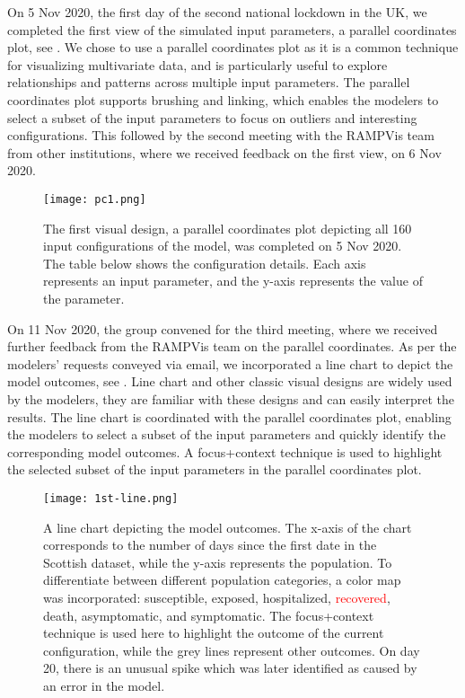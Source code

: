 
On 5 Nov 2020, the first day of the second national lockdown in the UK, we completed the first view of the simulated input parameters, a parallel coordinates plot, see .
We chose to use a parallel coordinates plot as it is a common technique for visualizing multivariate data, and is particularly useful to explore relationships and patterns across multiple input parameters.
The parallel coordinates plot supports brushing and linking, which enables the modelers to select a subset of the input parameters to focus on outliers and interesting configurations.
This followed by the second meeting with the RAMPVis team from other institutions, where we received feedback on the first view, on 6 Nov 2020.

\begin{figure}[tb!]
    \centering
    \texttt{[image: pc1.png]}
    \caption{The first visual design, a parallel coordinates plot depicting all 160 input configurations of the model, was completed on 5 Nov 2020. The table below shows the configuration details.
    Each axis represents an input parameter, and the y-axis represents the value of the parameter.
    }
    \label{fig:pc1}

\end{figure}


On 11 Nov 2020, the group convened for the third meeting, where we received further feedback from the RAMPVis team on the parallel coordinates. As per the modelers' requests conveyed via email, we incorporated a line chart to depict the model outcomes, see .
Line chart and other classic visual designs are widely used by the modelers, they are familiar with these designs and can easily interpret the results.
The line chart is coordinated with the parallel coordinates plot, enabling the modelers to select a subset of the input parameters and quickly identify the corresponding model outcomes. A focus+context technique is used to highlight the selected subset of the input parameters in the parallel coordinates plot.

\begin{figure}[tb!]
    \centering
    \texttt{[image: 1st-line.png]}
    \caption{A line chart depicting the model outcomes.
    The x-axis of the chart corresponds to the number of days since the first date in the Scottish dataset, while the y-axis represents the population.
    To differentiate between different population categories, a color map was incorporated: \textcolor{DodgerBlue1}{susceptible}, \textcolor{Chocolate1}{exposed}, \textcolor{Green4}{hospitalized}, \textcolor{red}{recovered}, \textcolor{DarkOrchid1}{death}, \textcolor{LightSalmon4}{asymptomatic}, and \textcolor{HotPink1}{symptomatic}.
    The focus+context technique is used here to highlight the outcome of the current configuration, while the grey lines represent other outcomes. On day 20, there is an unusual spike which was later identified as caused by an error in the model.
    }
    \label{fig:1st-line}

\end{figure}

